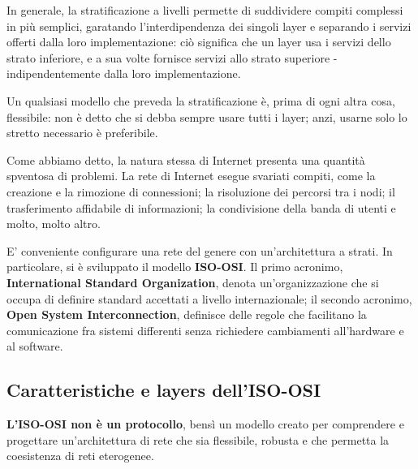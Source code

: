 \vspace{3mm}

In generale, la stratificazione a livelli permette di suddividere compiti complessi in più semplici, garatando l'interdipendenza dei singoli layer e separando i servizi offerti dalla loro implementazione: ciò significa che un layer usa i servizi dello strato inferiore, e a sua volte fornisce servizi allo strato superiore - indipendentemente dalla loro implementazione.

\vspace{3mm}

Un qualsiasi modello che preveda la stratificazione è, prima di ogni altra cosa, flessibile: non è detto che si debba sempre usare tutti i layer; anzi, usarne solo lo stretto necessario è preferibile.

\vspace{3mm}

Come abbiamo detto, la natura stessa di Internet presenta una quantità spventosa di problemi. La rete di Internet esegue svariati compiti, come la creazione e la rimozione di connessioni; la risoluzione dei percorsi tra i nodi; il trasferimento affidabile di informazioni; la condivisione della banda di utenti e molto, molto altro.

\vspace{3mm}

E' conveniente configurare una rete del genere con un'architettura a strati. In particolare, si è sviluppato il modello \textbf{ISO-OSI}. Il primo acronimo, \textbf{International Standard Organization}, denota un'organizzazione che si occupa di definire standard accettati a livello internazionale; il secondo acronimo, \textbf{Open System Interconnection}, definisce delle regole che facilitano la comunicazione fra sistemi differenti senza richiedere cambiamenti all'hardware e al software.

\subsection{Caratteristiche e layers dell'ISO-OSI}

\textbf{L'ISO-OSI non è un protocollo}, bensì un modello creato per comprendere e progettare un'architettura di rete che sia flessibile, robusta e che permetta la coesistenza di reti eterogenee.

